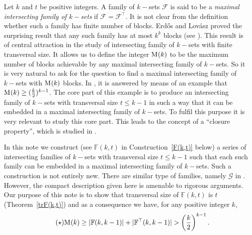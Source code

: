 \documentclass[a4paper,reqno,10pt]{amsart}
\theoremstyle{definition}
\begin{document}
Let $k$ and $t$ be positive integers. A family of $k-$sets $\mathcal{F}$ is said to be a \emph{maximal intersecting family of $k-$sets} if $\mathcal{F}=\mathcal{F}^{\top}$. It is not clear from the definition whether such a family has finite number of blocks. Erd\H{o}s and Lov\'{a}sz proved the surprising result that any such family has at most $k^{k}$ blocks (see \cite[Theorem~7]{MR0382050}). This result is of central attraction in the study of intersecting family of $k-$sets with finite transversal size. It allows us to define the integer ${\ensuremath{{\textnormal{M}}_{}({k})}}$ to be the maximum number of blocks achievable by any maximal intersecting family of $k-$sets. So it is very natural to ask for the question to find a maximal intersecting family of $k-$sets with ${\ensuremath{{\textnormal{M}}_{}({k})}}$ blocks. In \cite{aX14111480}, it is answered by means of an example that ${\ensuremath{{\textnormal{M}}_{}({k})}}\geq(\frac{k}{2})^{k-1}$. The core part of this example is to produce an intersecting family of $k-$sets with transversal size $t\leq k-1$ in such a way that it can be embedded in a 
maximal intersecting family of $k-$sets. To fulfil this purpose it is very relevant to study this core part. This leads to the concept of a ``closure property'', which is studied in \cite[\textsection~2]{aX14111480}. 

In this note we construct (see $\mathbb{F}(k,t)$ in Construction~\ref{F(k,t)} below) a series of intersecting families of $k-$sets with transversal size $t\leq k-1$ such that each such family can be embedded in a maximal intersecting family of $k-$sets. Such a construction is not entirely new. There are similar type of families, namely $\mathscr{G}$ in \cite[\textsection~2]{MR1383503}. However, the compact description given here is amenable to rigorous arguments. Our purpose of this note is to show that transversal size of $\mathbb{F}(k,t)$ is $t$ (Theorem~\ref{trF(k,t)}) and as a consequence we have, for any positive integer $k$,
\begin{equation}\label{M(k)}\tag{$\star$}
{\ensuremath{{\textnormal{M}}_{}({k})}}\geq|\mathbb{F}(k,k-1)|+|\mathbb{F}^{\top}(k,k-1)|>\left(\frac{k}{2}\right)^{k-1}.
\end{equation}
\end{document}

